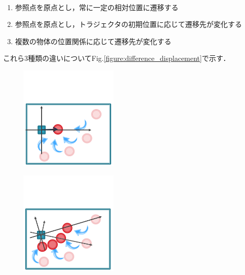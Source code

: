 \clearpage
　
	\begin{enumerate}
		\item 参照点を原点とし，常に一定の相対位置に遷移する
		\item 参照点を原点とし，トラジェクタの初期位置に応じて遷移先が変化する
		\item 複数の物体の位置関係に応じて遷移先が変化する
	\end{enumerate}
これら3種類の違いについてFig.\ref{figure:difference_displacement}で示す．
\begin{figure}[h]
	\centering
	\begin{minipage}[t]{.3\textwidth}
		\centering
		\includegraphics[width=4.7cm]{figure2_sub_a.png} \\ %
		\label{subfigure:difference_displacement1}    
	\end{minipage}
	\begin{minipage}[t]{.3\textwidth}
		\centering
		\includegraphics[width=4.7cm]{figure2_sub_b.png} \\ %
		\label{subfigure:difference_displacement2}
	\end{minipage}
	\begin{minipage}[t]{.3\textwidth}

\end{minipage}
\end{figure}
